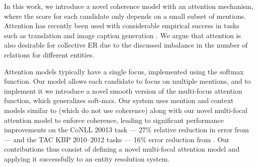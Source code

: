 


In this work, we introduce a novel coherence model with an attention mechanism, where the 
score for each candidate only depends on a small subset of mentions.
 Attention has recently been
used with considerable empirical success in tasks such as translation
\cite{bahdanau2014neural} and image caption generation
\cite{xu2015show}. We argue that attention is also desirable for
collective ER due to the discussed imbalance in the number of
relations for different entities.

Attention models typically have a single focus, implemented using the
 softmax function. Our model allows each candidate to
 focus on multiple mentions, and to implement it we introduce a 
 novel smooth version of the
 multi-focus attention function, which generalizes soft-max.
Our system uses mention and context models similar to  
 (which do not use coherence) along with our novel 
multi-focal attention model to 
enforce coherence, leading to significant performance improvements 
on the CoNLL 20013 \cite{Hoffart2011} task --- 27\% relative reduction
in error from  --- and the
TAC KBP 2010--2012 tasks \cite{TAC2010,TAC2011,TAC2012}
--- 16\% error reduction from .
Our contributions thus consist of defining a novel multi-focal
attention model and applying it
successfully to an entity resolution system.





